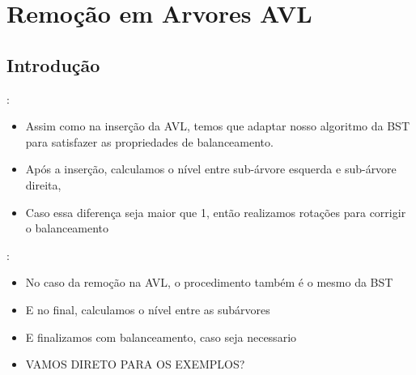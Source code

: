 \section{Remoção em Arvores AVL}
\subsection{Introdução}
\begin{frame}{\secname : \subsecname}

  \begin{itemize}
  \item Assim como na inserção da AVL, temos que adaptar nosso algoritmo da BST para satisfazer as propriedades de balanceamento.
  \item Após a inserção, calculamos o nível entre sub-árvore esquerda e sub-árvore direita, 
  \item Caso essa diferença seja maior que 1, então realizamos rotações para corrigir o balanceamento
\end{itemize}


  
\end{frame}

\begin{frame}{\secname : \subsecname}

  \begin{itemize}
  \item No caso da remoção na AVL, o procedimento também é o mesmo da BST
  \item E no final, calculamos o nível entre as subárvores
  \item E finalizamos com balanceamento, caso seja necessario
  \item VAMOS DIRETO PARA OS EXEMPLOS?
  \end{itemize}
\end{frame}
